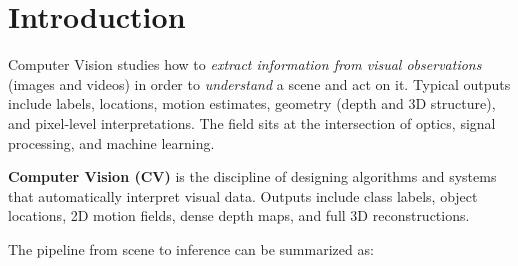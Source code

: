\documentclass[11pt, oneside]{book}
\begin{document}
\setcounter{tocdepth}{2}

\begingroup
  \let\cleardoublepage\relax
  \let\clearpage\relax
  \tableofcontents
\endgroup

\mainmatter


\chapter{Introduction}

Computer Vision studies how to \emph{extract information from visual observations}
(images and videos) in order to \emph{understand} a scene and act on it.
Typical outputs include labels, locations, motion estimates, geometry (depth and 3D structure),
and pixel-level interpretations.
The field sits at the intersection of optics, signal processing, and machine learning.

\begin{defbox}[title={Computer Vision}]
\textbf{Computer Vision (CV)} is the discipline of designing algorithms and systems that
automatically interpret visual data. Outputs include class labels, object locations, 2D motion fields,
dense depth maps, and full 3D reconstructions.
\end{defbox}

The pipeline from scene to inference can be summarized as:

\begin{center}
\end{center}
\end{document}
